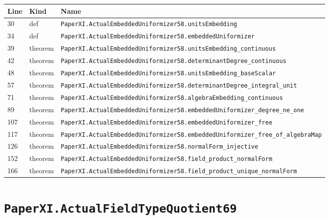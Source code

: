 \documentclass[10pt,oneside]{book}
\begin{document}
\begin{longtable}{@{}p{}p{}p{}@{}}\toprule Line&Kind&Name\\\midrule\endhead

30&def&\nolinkurl{PaperXI.ActualEmbeddedUniformizer58.unitsEmbedding}\\

34&def&\nolinkurl{PaperXI.ActualEmbeddedUniformizer58.embeddedUniformizer}\\

39&theorem&\nolinkurl{PaperXI.ActualEmbeddedUniformizer58.unitsEmbedding_continuous}\\

42&theorem&\nolinkurl{PaperXI.ActualEmbeddedUniformizer58.determinantDegree_continuous}\\

48&theorem&\nolinkurl{PaperXI.ActualEmbeddedUniformizer58.unitsEmbedding_baseScalar}\\

57&theorem&\nolinkurl{PaperXI.ActualEmbeddedUniformizer58.determinantDegree_integral_unit}\\

71&theorem&\nolinkurl{PaperXI.ActualEmbeddedUniformizer58.algebraEmbedding_continuous}\\

89&theorem&\nolinkurl{PaperXI.ActualEmbeddedUniformizer58.embeddedUniformizer_degree_ne_one}\\

107&theorem&\nolinkurl{PaperXI.ActualEmbeddedUniformizer58.embeddedUniformizer_free}\\

117&theorem&\nolinkurl{PaperXI.ActualEmbeddedUniformizer58.embeddedUniformizer_free_of_algebraMap}\\

126&theorem&\nolinkurl{PaperXI.ActualEmbeddedUniformizer58.normalForm_injective}\\

152&theorem&\nolinkurl{PaperXI.ActualEmbeddedUniformizer58.field_product_normalForm}\\

166&theorem&\nolinkurl{PaperXI.ActualEmbeddedUniformizer58.field_product_unique_normalForm}\\

\bottomrule\end{longtable}

\section{\texorpdfstring{\nolinkurl{PaperXI.ActualFieldTypeQuotient69}}{PaperXI.ActualFieldTypeQuotient69}}\label{module:PaperXI.ActualFieldTypeQuotient69}
\end{document}
